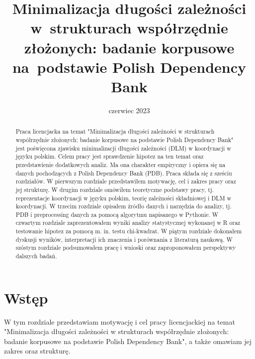 \documentclass[licencjacka]{pracamgr}
\title{Minimalizacja długości zależności w~strukturach współrzędnie złożonych: badanie korpusowe na~podstawie Polish Dependency Bank}
\date{czerwiec 2023}
\begin{document}
\maketitle


\begin{abstract}
Praca licencjacka na temat "Minimalizacja długości zależności w strukturach współrzędnie złożonych: badanie korpusowe na podstawie Polish Dependency Bank"  jest poświęcona zjawisku minimalizacji długości zależności (DLM) w koordynacji w języku polskim. Celem pracy jest sprawdzenie hipotez na ten temat oraz przedstawienie dodatkowych analiz. Ma ona charakter empiryczny i opiera się na danych pochodzących z Polish Dependency Bank (PDB). Praca składa się z sześciu rozdziałów. W pierwszym rozdziale przedstawiłem motywację, cel i zakres pracy oraz jej strukturę. W drugim rozdziale omówiłem teoretyczne podstawy pracy, tj. reprezentacje koordynacji w języku polskim, teorię zależności składniowej i DLM w koordynacji. W trzecim rozdziale opisałem źródło danych i narzędzia do analizy, tj. PDB i preprocessing
danych za pomocą algorytmu napisanego w Pythonie. W czwartym rozdziale zaprezentowałem wyniki analizy statystycznej wykonanej w R oraz testowanie hipotez za pomocą m. in. testu chi-kwadrat. W piątym rozdziale dokonałem dyskusji wyników, interpretacji ich znaczenia i porównania z literaturą naukową. W szóstym rozdziale podsumowałem pracę i wnioski oraz zaproponowałem perspektywy dalszych badań.
\end{abstract}

\thispagestyle{empty}
\setcounter{page}{3}
\tableofcontents 

\chapter{Wstęp}
W tym rozdziale przedstawiam motywację i cel pracy licencjackiej na temat "Minimalizacja długości zależności w strukturach współrzędnie złożonych: badanie korpusowe na podstawie Polish Dependency Bank", a także omawiam jej zakres oraz strukturę.
\end{document}
